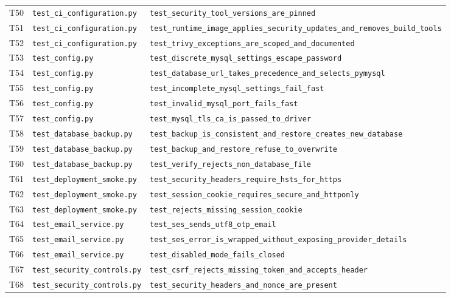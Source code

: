 {\begin{longtable}{P{.8cm}P{4cm}P{8cm}}
T50 & \nolinkurl{test_ci_configuration.py} & \nolinkurl{test_security_tool_versions_are_pinned} \\
T51 & \nolinkurl{test_ci_configuration.py} & \nolinkurl{test_runtime_image_applies_security_updates_and_removes_build_tools} \\
T52 & \nolinkurl{test_ci_configuration.py} & \nolinkurl{test_trivy_exceptions_are_scoped_and_documented} \\
T53 & \nolinkurl{test_config.py} & \nolinkurl{test_discrete_mysql_settings_escape_password} \\
T54 & \nolinkurl{test_config.py} & \nolinkurl{test_database_url_takes_precedence_and_selects_pymysql} \\
T55 & \nolinkurl{test_config.py} & \nolinkurl{test_incomplete_mysql_settings_fail_fast} \\
T56 & \nolinkurl{test_config.py} & \nolinkurl{test_invalid_mysql_port_fails_fast} \\
T57 & \nolinkurl{test_config.py} & \nolinkurl{test_mysql_tls_ca_is_passed_to_driver} \\
T58 & \nolinkurl{test_database_backup.py} & \nolinkurl{test_backup_is_consistent_and_restore_creates_new_database} \\
T59 & \nolinkurl{test_database_backup.py} & \nolinkurl{test_backup_and_restore_refuse_to_overwrite} \\
T60 & \nolinkurl{test_database_backup.py} & \nolinkurl{test_verify_rejects_non_database_file} \\
T61 & \nolinkurl{test_deployment_smoke.py} & \nolinkurl{test_security_headers_require_hsts_for_https} \\
T62 & \nolinkurl{test_deployment_smoke.py} & \nolinkurl{test_session_cookie_requires_secure_and_httponly} \\
T63 & \nolinkurl{test_deployment_smoke.py} & \nolinkurl{test_rejects_missing_session_cookie} \\
T64 & \nolinkurl{test_email_service.py} & \nolinkurl{test_ses_sends_utf8_otp_email} \\
T65 & \nolinkurl{test_email_service.py} & \nolinkurl{test_ses_error_is_wrapped_without_exposing_provider_details} \\
T66 & \nolinkurl{test_email_service.py} & \nolinkurl{test_disabled_mode_fails_closed} \\
T67 & \nolinkurl{test_security_controls.py} & \nolinkurl{test_csrf_rejects_missing_token_and_accepts_header} \\
T68 & \nolinkurl{test_security_controls.py} & \nolinkurl{test_security_headers_and_nonce_are_present} \\

\end{longtable}}
